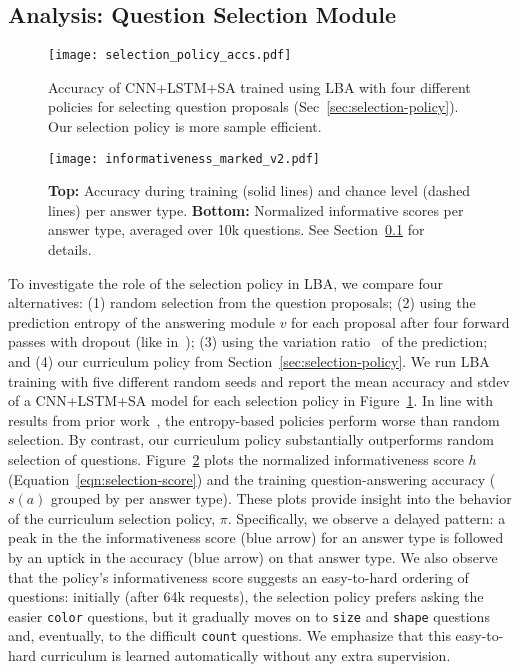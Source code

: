 \documentclass[10pt,twocolumn,letterpaper]{article}
\begin{document}
\subsection{Analysis: Question Selection Module}
\label{sec:analyze_selection}
\vspace{-0.05in}
\begin{figure}[!t]
    \centering
    \texttt{[image: selection\_policy\_accs.pdf]}
    \vspace{-0.2in}
    \caption{Accuracy of CNN+LSTM+SA trained using LBA with four different policies for selecting question proposals (Sec~\ref{sec:selection-policy}). Our selection policy is more sample efficient.}
    \vspace{-0.2in}
    \label{fig:ablation_selection}
\end{figure}
\begin{figure}[!h]
    \centering
    \footnotesize{
    \texttt{[image: informativeness\_marked\_v2.pdf]}
    \vspace{-0.2in}
    \caption{\textbf{Top:} Accuracy during training (solid lines) and chance level (dashed lines) per answer type. \textbf{Bottom:} Normalized informative scores per answer type, averaged over 10k questions. See Section~\ref{sec:analyze_selection} for details.}
        \label{fig:selection_inform}
    }
\vspace{-1em}
\end{figure}
To investigate the role of the selection policy in LBA, we compare four alternatives: (1) random selection from the question proposals; (2) using the prediction entropy of the answering module $v$ for each proposal after four forward passes with dropout (like in~\cite{sener2017geometric}); (3) using the variation ratio~\cite{freeman1965} of the prediction; and (4) our curriculum policy from Section~\ref{sec:selection-policy}.
We run LBA training with five different random seeds and report the mean accuracy and stdev of a CNN+LSTM+SA model for each selection policy in Figure~\ref{fig:ablation_selection}. In line with results from prior work~\cite{sener2017geometric}, the entropy-based policies perform worse than random selection. By contrast, our curriculum policy substantially outperforms random selection of questions. 
Figure~\ref{fig:selection_inform} plots the normalized informativeness score $h$  (Equation~\ref{eqn:selection-score}) and the training question-answering accuracy ($s(a)$ grouped by per answer type). These plots provide insight into the behavior of the curriculum selection policy, $\pi$. Specifically, we observe a delayed pattern: a peak in the the informativeness score (blue arrow) for an answer type is followed by an uptick in the accuracy (blue arrow) on that answer type. 
We also observe that the policy's informativeness score suggests an easy-to-hard ordering of questions: initially (after 64k requests), the selection policy prefers asking the easier \texttt{color} questions, but it gradually moves on to \texttt{size} and \texttt{shape} questions and, eventually, to the difficult \texttt{count} questions. We emphasize that this easy-to-hard curriculum is learned automatically without any extra supervision.
\end{document}
